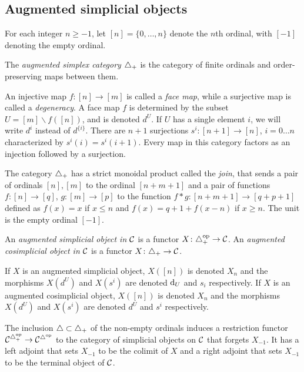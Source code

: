 \subsection{Augmented simplicial objects}\label{s:simplices}

For each integer $n \geq -1$, let $[n] = \{0,\dots,n\}$ denote the $n$th ordinal, with $[-1]$ denoting the empty ordinal.

\begin{definition}
	The \emph{augmented simplex category} $\triangle_{+}$ is the category of finite ordinals and order-preserving maps between them. 
\end{definition}

An injective map $f \colon [n] \to [m]$ is called a \emph{face map}, while a surjective map is called a \emph{degeneracy}. A face map $f$ is determined by the subset $U = [m]\smallsetminus f([n])$, and is denoted $d^U$. If $U$ has a single element $i$, we will write $d^i$ instead of $d^{\{i\}}$. There are $n+1$ surjections $s^i \colon [n+1] \to [n]$, $i = 0\dots n$ characterized by $s^i(i) = s^i(i+1)$. Every map in this category factors as an injection followed by a surjection.

The category $\triangle_{+}$ has a strict monoidal product called the \emph{join}, that sends a pair of ordinals $[n],[m]$ to the ordinal $[n+m+1]$ and a pair of functions $f \colon [n] \to [q]$, $g \colon [m] \to [p]$ to the function $f*g \colon [n+m+1] \to [q+p+1]$ defined as $f(x) = x$ if $x\leq n$ and $f(x) = q+1+f(x-n)$ if $x \geq n$. The unit is the empty ordinal $[-1]$.

\begin{definition}
	An \emph{augmented simplicial object in $\mathcal{C}$} is a functor $X \colon \triangle_{+}^\mathrm{op} \to \mathcal{C}$.
	An \emph{augmented cosimplicial object in $\mathcal{C}$} is a functor $X \colon \triangle_{+} \to \mathcal{C}$.
\end{definition}

If $X$ is an augmented simplicial object, $X([n])$ is denoted $X_n$ and the morphisms $X(d^U)$ and $X(s^i)$ are denoted $\operatorname{d}_U$ and $s_i$ respectively. If $X$ is an augmented cosimplicial object, $X([n])$ is denoted $X_n$ and the morphisms $X(d^U)$ and $X(s^i)$ are denoted $d^U$ and $s^i$ respectively.

The inclusion $\triangle \subset \triangle_{+}$ of the non-empty ordinals induces a restriction functor $\mathcal{C}^{\triangle_{+}^{{\mathrm{op}}}} \to \mathcal{C}^{\triangle^{{\mathrm{op}}}}$ to the category of simplicial objects on $\mathcal{C}$ that forgets $X_{-1}$. It has a left adjoint that sets $X_{-1}$ to be the colimit of $X$ and a right adjoint that sets $X_{-1}$ to be the terminal object of $\mathcal{C}$.

